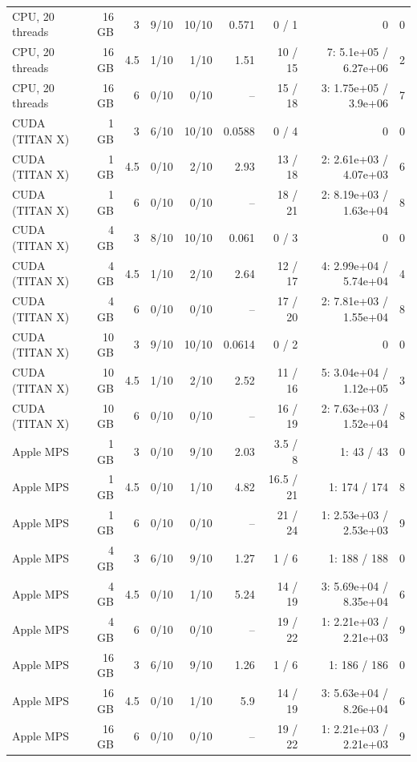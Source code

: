 \begin{table}[H]
{\begin{tabular}{lrrrrrrrr}
CPU, 20 threads & 16 GB & 3 & 9/10 & 10/10 & 0.571 & 0 / 1 & 0 & 0 \\
CPU, 20 threads & 16 GB & 4.5 & 1/10 & 1/10 & 1.51 & 10 / 15 & 7: 5.1e+05 / 6.27e+06 & 2 \\
CPU, 20 threads & 16 GB & 6 & 0/10 & 0/10 & -- & 15 / 18 & 3: 1.75e+05 / 3.9e+06 & 7 \\
CUDA (TITAN X) & 1 GB & 3 & 6/10 & 10/10 & 0.0588 & 0 / 4 & 0 & 0 \\
CUDA (TITAN X) & 1 GB & 4.5 & 0/10 & 2/10 & 2.93 & 13 / 18 & 2: 2.61e+03 / 4.07e+03 & 6 \\
CUDA (TITAN X) & 1 GB & 6 & 0/10 & 0/10 & -- & 18 / 21 & 2: 8.19e+03 / 1.63e+04 & 8 \\
CUDA (TITAN X) & 4 GB & 3 & 8/10 & 10/10 & 0.061 & 0 / 3 & 0 & 0 \\
CUDA (TITAN X) & 4 GB & 4.5 & 1/10 & 2/10 & 2.64 & 12 / 17 & 4: 2.99e+04 / 5.74e+04 & 4 \\
CUDA (TITAN X) & 4 GB & 6 & 0/10 & 0/10 & -- & 17 / 20 & 2: 7.81e+03 / 1.55e+04 & 8 \\
CUDA (TITAN X) & 10 GB & 3 & 9/10 & 10/10 & 0.0614 & 0 / 2 & 0 & 0 \\
CUDA (TITAN X) & 10 GB & 4.5 & 1/10 & 2/10 & 2.52 & 11 / 16 & 5: 3.04e+04 / 1.12e+05 & 3 \\
CUDA (TITAN X) & 10 GB & 6 & 0/10 & 0/10 & -- & 16 / 19 & 2: 7.63e+03 / 1.52e+04 & 8 \\
Apple MPS & 1 GB & 3 & 0/10 & 9/10 & 2.03 & 3.5 / 8 & 1: 43 / 43 & 0 \\
Apple MPS & 1 GB & 4.5 & 0/10 & 1/10 & 4.82 & 16.5 / 21 & 1: 174 / 174 & 8 \\
Apple MPS & 1 GB & 6 & 0/10 & 0/10 & -- & 21 / 24 & 1: 2.53e+03 / 2.53e+03 & 9 \\
Apple MPS & 4 GB & 3 & 6/10 & 9/10 & 1.27 & 1 / 6 & 1: 188 / 188 & 0 \\
Apple MPS & 4 GB & 4.5 & 0/10 & 1/10 & 5.24 & 14 / 19 & 3: 5.69e+04 / 8.35e+04 & 6 \\
Apple MPS & 4 GB & 6 & 0/10 & 0/10 & -- & 19 / 22 & 1: 2.21e+03 / 2.21e+03 & 9 \\
Apple MPS & 16 GB & 3 & 6/10 & 9/10 & 1.26 & 1 / 6 & 1: 186 / 186 & 0 \\
Apple MPS & 16 GB & 4.5 & 0/10 & 1/10 & 5.9 & 14 / 19 & 3: 5.63e+04 / 8.26e+04 & 6 \\
Apple MPS & 16 GB & 6 & 0/10 & 0/10 & -- & 19 / 22 & 1: 2.21e+03 / 2.21e+03 & 9 \\
\bottomrule\end{tabular}}
\end{table}
